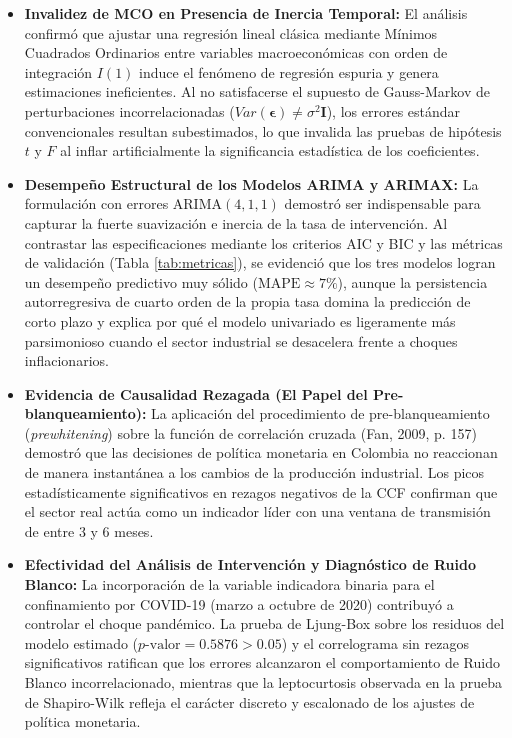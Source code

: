 \documentclass[11pt,letterpaper]{article}
\begin{document}
\begin{itemize}
    \item \textbf{Invalidez de MCO en Presencia de Inercia Temporal:} 
    El análisis confirmó que ajustar una regresión lineal clásica mediante Mínimos Cuadrados Ordinarios entre variables macroeconómicas con orden de integración $I(1)$ induce el fenómeno de regresión espuria y genera estimaciones ineficientes. Al no satisfacerse el supuesto de Gauss-Markov de perturbaciones incorrelacionadas ($Var(\boldsymbol{\epsilon}) \neq \sigma^2 \mathbf{I}$), los errores estándar convencionales resultan subestimados, lo que invalida las pruebas de hipótesis $t$ y $F$ al inflar artificialmente la significancia estadística de los coeficientes.

    \item \textbf{Desempeño Estructural de los Modelos ARIMA y ARIMAX:} 
    La formulación con errores $\text{ARIMA}(4,1,1)$ demostró ser indispensable para capturar la fuerte suavización e inercia de la tasa de intervención. Al contrastar las especificaciones mediante los criterios AIC y BIC y las métricas de validación (Tabla \ref{tab:metricas}), se evidenció que los tres modelos logran un desempeño predictivo muy sólido ($\text{MAPE} \approx 7\%$), aunque la persistencia autorregresiva de cuarto orden de la propia tasa domina la predicción de corto plazo y explica por qué el modelo univariado es ligeramente más parsimonioso cuando el sector industrial se desacelera frente a choques inflacionarios.

    \item \textbf{Evidencia de Causalidad Rezagada (El Papel del Pre-blanqueamiento):} 
    La aplicación del procedimiento de pre-blanqueamiento (\textit{prewhitening}) sobre la función de correlación cruzada (Fan, 2009, p. 157) demostró que las decisiones de política monetaria en Colombia no reaccionan de manera instantánea a los cambios de la producción industrial. Los picos estadísticamente significativos en rezagos negativos de la CCF confirman que el sector real actúa como un indicador líder con una ventana de transmisión de entre 3 y 6 meses.

    \item \textbf{Efectividad del Análisis de Intervención y Diagnóstico de Ruido Blanco:} 
    La incorporación de la variable indicadora binaria para el confinamiento por COVID-19 (marzo a octubre de 2020) contribuyó a controlar el choque pandémico. La prueba de Ljung-Box sobre los residuos del modelo estimado ($p\text{-valor} = 0.5876 > 0.05$) y el correlograma sin rezagos significativos ratifican que los errores alcanzaron el comportamiento de Ruido Blanco incorrelacionado, mientras que la leptocurtosis observada en la prueba de Shapiro-Wilk refleja el carácter discreto y escalonado de los ajustes de política monetaria.


\end{itemize}
\end{document}
